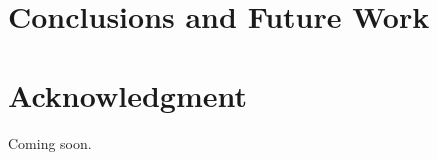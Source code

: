 \documentclass[10pt,conference]{IEEEtran}
\begin{document}








\section{Conclusions and Future Work}

\section*{Acknowledgment}
Coming soon.



\end{document}
